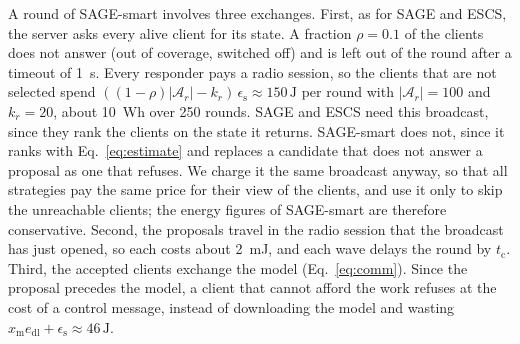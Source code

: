 A round of SAGE-smart involves three exchanges. First, as for SAGE and ESCS,
the server asks every alive client for its state. A fraction $\rho=0.1$ of the
clients does not answer (out of coverage, switched off) and is left out of the
round after a timeout of 1~s. Every responder pays a radio session, so the
clients that are not selected spend
$((1-\rho)|\mathcal{A}_r|-k_r)\,\epsilon_{\mathrm{s}}\approx150\,\mathrm{J}$
per round with $|\mathcal{A}_r|=100$ and $k_r=20$, about 10~Wh over 250
rounds. SAGE and ESCS need this broadcast, since they rank the clients on the
state it returns. SAGE-smart does not, since it ranks with
Eq.~\eqref{eq:estimate} and replaces a candidate that does not answer a
proposal as one that refuses. We charge it the same broadcast anyway, so that
all strategies pay the same price for their view of the clients, and use it
only to skip the unreachable clients; the energy figures of SAGE-smart are
therefore conservative. Second, the proposals travel in the radio session that
the broadcast has just opened, so each costs about 2~mJ, and each wave delays
the round by $t_{\mathrm{c}}$. Third, the accepted clients exchange the model
(Eq.~\eqref{eq:comm}). Since the proposal precedes the model, a client that
cannot afford the work refuses at the cost of a control message, instead of
downloading the model and wasting
$x_{\mathrm{m}}e_{\mathrm{dl}}+\epsilon_{\mathrm{s}}\approx46\,\mathrm{J}$.
